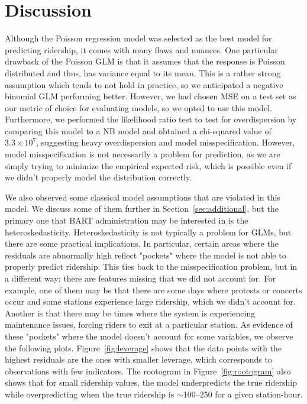 \documentclass[11pt, letterpaper]{article}
\begin{document}
\section{Discussion}
\label{sec:discussion}

Although the Poisson regression model was selected as the best model for predicting ridership, it comes with many flaws and nuances. One particular drawback of the Poisson GLM is that it assumes that the response is Poisson distributed and thus, has variance equal to its mean. This is a rather strong assumption which tends to not hold in practice, so we anticipated a negative binomial GLM performing better. However, we had chosen MSE on a test set as our metric of choice for evaluating models, so we opted to use this model. Furthermore, we performed the likelihood ratio test to test for overdispersion by comparing this model to a NB model and obtained a chi-squared value of $3.3\times10^7$, suggesting heavy overdispersion and model misspecification. However, model misspecification is not necessarily a problem for prediction, as we are simply trying to minimize the empirical expected risk, which is possible even if we didn't properly model the distribution correctly.

We also observed some classical model assumptions that are violated in this model. We discuss some of them further in Section~\ref{sec:additional}, but the primary one that BART administration may be interested in is the heteroskedasticity. Heteroskedasticity is not typically a problem for GLMs, but there are some practical implications. In particular, certain areas where the residuals are abnormally high reflect "pockets" where the model is not able to properly predict ridership. This ties back to the misspecification problem, but in a different way: there are features missing that we did not account for. For example, one of them may be that there are some days where protests or concerts occur and some stations experience large ridership, which we didn't account for. Another is that there may be times where the system is experiencing maintenance issues, forcing riders to exit at a particular station. As evidence of these "pockets" where the model doesn't account for some variables, we observe the following plots. Figure~\ref{fig:leverage} shows that the data points with the highest residuals are the ones with smaller leverage, which corresponds to observations with few indicators. The rootogram in Figure~\ref{fig:rootogram} also shows that for small ridership values, the model underpredicts the true ridership while overpredicting when the true ridership is $\sim$100--250 for a given station-hour.
\end{document}
